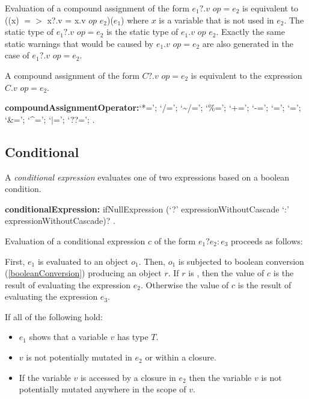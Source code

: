 \documentclass{article}
\newcommand{\code}[1]{{\sf #1}}
\begin{document}
\LMHash{}
Evaluation of a compound assignment of the form $e_1?.v$ $op = e_2$ is equivalent to \code{((x) $=>$ x?.v = x.v $op$ $e_2$)($e_1$)} where $x$ is a variable that is not used in $e_2$. The static type of $e_1?.v$ $op = e_2$ is the static type of $e_1.v$ $op$ $e_2$. Exactly the same static warnings that would be caused by $e_1.v$ $op = e_2$ are also generated in the case of $e_1?.v$ $op = e_2$.

\LMHash{}
A compound assignment of the form $C?.v$ $op = e_2$ is equivalent to the expression
$C.v$ $op = e_2$.

\begin{grammar}
{\bf compoundAssignmentOperator:}`*=';
      `/=';
      `\~{}/=';
      `\%=';
      `+=';
      `-=';
      `{\escapegrammar \lt \lt}=';
       `{\escapegrammar \gt \gt}=';
      `\&=';
      `\^{}=';
      `$|$=';
      `??=';
    .
\end{grammar}


\subsection{ Conditional}

\LMHash{}
A {\em conditional expression} evaluates one of two expressions based on a boolean condition.

\begin{grammar}
  {\bf conditionalExpression:}
     ifNullExpression (`?' expressionWithoutCascade `{\escapegrammar :}' expressionWithoutCascade)?
    . %
\end{grammar}

\LMHash{}
Evaluation of a conditional expression $c$ of the form $e_1 ? e_2 : e_3$ proceeds as follows:

\LMHash{}
First, $e_1$ is evaluated to an object $o_1$.  Then, $o_1$ is  subjected to boolean conversion (\ref{booleanConversion}) producing an object $r$.  If $r$ is \TRUE, then the value of $c$ is the result of evaluating the expression $e_2$. Otherwise the value of $c$ is the result of evaluating the expression $e_3$.

\LMHash{}
If all of the following hold:
\begin{itemize}
\item $e_1$ shows that a variable $v$ has type $T$.
\item $v$ is not potentially mutated in $e_2$ or within a closure.
\item If the variable $v$ is accessed by a closure in $e_2$ then the variable $v$ is not potentially mutated anywhere in the scope of $v$.
\end{itemize}
\end{document}
